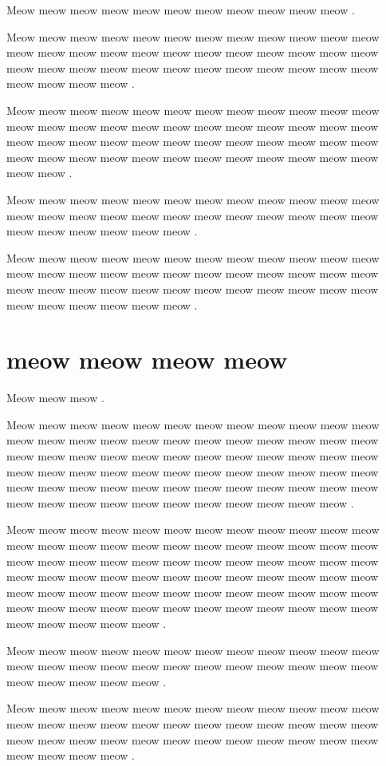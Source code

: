\documentclass[12pt, a5paper, openany]{book}
\begin{document}
Meow meow meow meow meow meow meow meow meow meow meow .

Meow meow meow meow meow meow meow meow meow meow meow meow meow meow meow meow meow meow meow meow meow meow meow meow meow meow meow meow meow meow meow meow meow meow meow meow meow meow meow meow .

Meow meow meow meow meow meow meow meow meow meow meow meow meow meow meow meow meow meow meow meow meow meow meow meow meow meow meow meow meow meow meow meow meow meow meow meow meow meow meow meow meow meow meow meow meow meow meow meow meow meow .

Meow meow meow meow meow meow meow meow meow meow meow meow meow meow meow meow meow meow meow meow meow meow meow meow meow meow meow meow meow meow .

Meow meow meow meow meow meow meow meow meow meow meow meow meow meow meow meow meow meow meow meow meow meow meow meow meow meow meow meow meow meow meow meow meow meow meow meow meow meow meow meow meow meow .



\chapter{meow meow meow meow }Meow meow meow .

Meow meow meow meow meow meow meow meow meow meow meow meow meow meow meow meow meow meow meow meow meow meow meow meow meow meow meow meow meow meow meow meow meow meow meow meow meow meow meow meow meow meow meow meow meow meow meow meow meow meow meow meow meow meow meow meow meow meow meow meow meow meow meow meow meow meow meow meow meow meow meow .

Meow meow meow meow meow meow meow meow meow meow meow meow meow meow meow meow meow meow meow meow meow meow meow meow meow meow meow meow meow meow meow meow meow meow meow meow meow meow meow meow meow meow meow meow meow meow meow meow meow meow meow meow meow meow meow meow meow meow meow meow meow meow meow meow meow meow meow meow meow meow meow meow meow meow meow meow meow .

Meow meow meow meow meow meow meow meow meow meow meow meow meow meow meow meow meow meow meow meow meow meow meow meow meow meow meow meow meow .

Meow meow meow meow meow meow meow meow meow meow meow meow meow meow meow meow meow meow meow meow meow meow meow meow meow meow meow meow meow meow meow meow meow meow meow meow meow meow meow meow .
\end{document}
